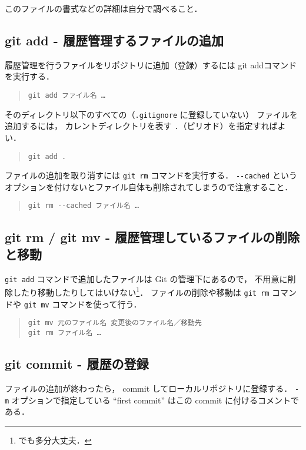 \documentclass[a4j,10pt]{jarticle}
\begin{document}
このファイルの書式などの詳細は自分で調べること．

\subsection{git add - 履歴管理するファイルの追加}
履歴管理を行うファイルをリポジトリに追加（登録）するには
git addコマンドを実行する．

\begin{quote}
\begin{verbatim}
git add ファイル名 …
\end{verbatim}
\end{quote}

そのディレクトリ以下のすべての（\verb|.gitignore| に登録していない）
ファイルを追加するには，
カレントディレクトリを表す \verb|.|（ピリオド）を指定すればよい．

\begin{quote}
\begin{verbatim}
git add .
\end{verbatim}
\end{quote}

ファイルの追加を取り消すには \verb|git rm| コマンドを実行する．
\verb|--cached|
というオプションを付けないとファイル自体も削除されてしまうので注意すること．

\begin{quote}
\begin{verbatim}
git rm --cached ファイル名 …
\end{verbatim}
\end{quote}

\subsection{git rm / git mv - 履歴管理しているファイルの削除と移動}
\verb|git add| コマンドで追加したファイルは Git の管理下にあるので，
不用意に削除したり移動したりしてはいけない\footnote{でも多分大丈夫．}．
ファイルの削除や移動は \verb|git rm| コマンドや
\verb|git mv| コマンドを使って行う．

\begin{quote}
\begin{verbatim}
git mv 元のファイル名 変更後のファイル名／移動先
git rm ファイル名 …
\end{verbatim}
\end{quote}

\subsection{git commit - 履歴の登録}
ファイルの追加が終わったら，
commit してローカルリポジトリに登録する．
\verb|-m| オプションで指定している
``first commit'' はこの commit に付けるコメントである．
\end{document}
